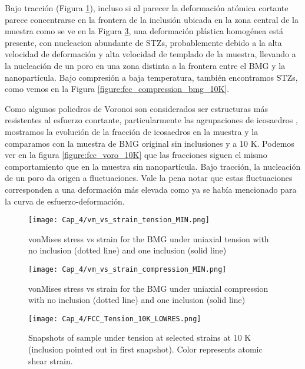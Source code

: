Bajo tracción (Figura \ref{figure:fcc_vm_tension}), incluso si al parecer la deformación atómica cortante parece concentrarse en la frontera de la inclusión ubicada en la zona central de la muestra como se ve en la Figura \ref{figure:fcc_tension_bmg_10K}, una deformación plástica homogénea está presente, con nucleacion abundante de STZs, probablemente debido a la alta velocidad de deformación y alta velocidad de templado de la muestra, llevando a la nucleación de un poro en una zona distinta a la frontera entre el BMG y la nanopartícula. Bajo compresión a baja temperatura, también encontramos STZs, como vemos en la Figura \ref{figure:fcc_compression_bmg_10K}.

Como algunos poliedros de Voronoi son considerados ser estructuras más resistentes al esfuerzo conrtante, particularmente las agrupaciones de icosaedros \cite{cheng08}, mostramos la evolución de la fracción de icosaedros en la muestra y la comparamos con la muestra de BMG original sin inclusiones y a 10 K. Podemos ver en la figura \ref{figure:fcc_voro_10K} que las fracciones siguen el mismo comportamiento que en la muestra sin nanopartícula. Bajo tracción, la nucleación de un poro da origen a fluctuaciones. Vale la pena notar que estas fluctuaciones corresponden a una deformación más elevada como ya se había mencionado para la curva de esfuerzo-deformación.

\begin{figure}[h!]
\centering
\texttt{[image: Cap\_4/vm\_vs\_strain\_tension\_MIN.png]}
\caption{vonMises stress vs strain for the BMG under uniaxial tension with no inclusion (dotted line) and one inclusion (solid line)}
\label{figure:fcc_vm_tension}
\end{figure}

\begin{figure}[h!]
\centering
\texttt{[image: Cap\_4/vm\_vs\_strain\_compression\_MIN.png]}
\caption{vonMises stress vs strain for the BMG under uniaxial compression with no inclusion (dotted line) and one inclusion (solid line)}
\label{figure:fcc_vm_compression}
\end{figure}

\begin{figure}[h!]
\centering
\texttt{[image: Cap\_4/FCC\_Tension\_10K\_LOWRES.png]}
\caption{Snapshots of sample under tension at selected strains at 10 K (inclusion pointed out in first snapshot). Color represents atomic shear strain.}
\label{figure:fcc_tension_bmg_10K}
\end{figure}

